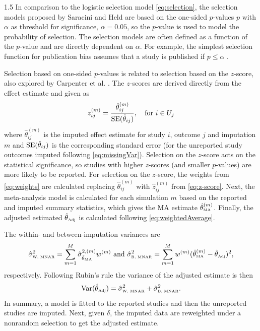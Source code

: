 \documentclass{article}
\begin{document}
\begin{spacing}{1.5}
In comparison to the logistic selection model \eqref{eq:selection}, the selection models proposed by Saracini and Held \cite{saracini2025addressing} are based on the one-sided $p$-values $p$ with $\alpha$ as threshold for significance, \eg $\alpha = 0.05$, so the $p$-value is used to model the probability of selection. The selection models are often defined as a function of the $p$-value and are directly dependent on $\alpha$. For example, the simplest selection function for publication bias assumes that a study is published if $p \le \alpha$ \cite{hedges1984estimation, sutton2000modelling}. 

Selection based on one-sided $p$-values is related to selection based on the $z$-score, also explored by Carpenter et al. \cite{carpenter2011assessing}.
The $z$-scores are derived directly from the effect estimate and given as \cite[p.170]{egger2022systematic}
\begin{equation} \label{eq:z-score}
z_{ij}^{(m)} = \frac{\hat\theta^{(m)}_{ij}}{\mbox{{SE}}(\hat\theta_{ij})}, \quad \text{for } i \in U_j
\end{equation}
where $\hat\theta^{(m)}_{ij}$ is the imputed effect estimate for study $i$, outcome $j$ and imputation $m$ and $\mbox{{SE}}(\hat\theta_{ij})$ is the corresponding standard error (for the unreported study outcomes imputed following \eqref{eq:missingVar}). Selection on the $z$-score acts on the statistical significance, so studies with higher $z$-scores (and smaller $p$-values) are more likely to be reported. For selection on the $z$-score, the weights from \eqref{eq:weights} are calculated replacing $\hat\theta_{ij}^{(m)}$ with  $\hat z_{ij}^{(m)}$ from \eqref{eq:z-score}. Next, the meta-analysis model is calculated for each simulation $m$ based on the reported and imputed summary statistics, which gives the  MA estimate $\hat\theta^{(m)}_{\tiny{\mbox{MA}}}$. Finally, the adjusted estimated $\hat\theta_{\tiny{\mbox{Adj}}}$ is calculated following \eqref{eq:weightedAverage}.

The within- and between-imputation variances are
\begin{equation*}
\hat\sigma_{\mbox{\tiny{W, MNAR}}}^2 = \sum^M_{m=1} \hat\sigma_{\hat\theta_{\tiny{\mbox{MA}}}}^{2, (m)} w^{(m)} \mbox{ and }
\hat\sigma_{\mbox{\tiny{B, MNAR}}}^2 = \sum^M_{m=1} w^{(m)} (\hat\theta^{(m)}_{\tiny{\mbox{MA}}} - \hat\theta_{\tiny{\mbox{Adj}}})^2, 
\end{equation*}
respectively. Following Rubin's rule the variance of the adjusted estimate is then
\begin{equation} \label{eq:var}
\mbox{{Var}}(\hat\theta_{\tiny{\mbox{Adj}}}) = \hat\sigma_{\mbox{\tiny{W, MNAR}}}^2 + \hat\sigma_{\mbox{\tiny{B, MNAR}}}^2.
\end{equation}
In summary, a model is fitted to the reported studies and then the unreported studies are imputed. Next, given $\delta$, the imputed data are reweighted under a nonrandom selection to get the adjusted estimate. 


\end{spacing}
\end{document}
